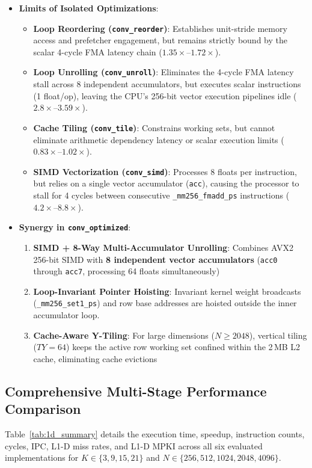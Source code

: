 \documentclass[11pt,a4paper]{article}
\begin{document}
\begin{itemize}
    \item \textbf{Limits of Isolated Optimizations}:
    \begin{itemize}
        \item \textbf{Loop Reordering (\texttt{conv\_reorder})}: Establishes unit-stride memory access and prefetcher engagement, but remains strictly bound by the scalar 4-cycle FMA latency chain ($1.35\times$--$1.72\times$).
        \item \textbf{Loop Unrolling (\texttt{conv\_unroll})}: Eliminates the 4-cycle FMA latency stall across 8 independent accumulators, but executes scalar instructions (1 float/op), leaving the CPU's 256-bit vector execution pipelines idle ($2.8\times$--$3.59\times$).
        \item \textbf{Cache Tiling (\texttt{conv\_tile})}: Constrains working sets, but cannot eliminate arithmetic dependency latency or scalar execution limits ($0.83\times$--$1.02\times$).
        \item \textbf{SIMD Vectorization (\texttt{conv\_simd})}: Processes 8 floats per instruction, but relies on a single vector accumulator (\texttt{acc}), causing the processor to stall for 4 cycles between consecutive \texttt{\_mm256\_fmadd\_ps} instructions ($4.2\times$--$8.8\times$).
    \end{itemize}
    \item \textbf{Synergy in \texttt{conv\_optimized}}:
    \begin{enumerate}
        \item \textbf{SIMD + 8-Way Multi-Accumulator Unrolling}: Combines AVX2 256-bit SIMD with \textbf{8 independent vector accumulators} (\texttt{acc0} through \texttt{acc7}, processing 64 floats simultaneously)
        \item \textbf{Loop-Invariant Pointer Hoisting}: Invariant kernel weight broadcasts (\texttt{\_mm256\_set1\_ps}) and row base addresses are hoisted outside the inner accumulator loop.
        \item \textbf{Cache-Aware Y-Tiling}: For large dimensions ($N \ge 2048$), vertical tiling ($TY=64$) keeps the active row working set confined within the 2\,MB L2 cache, eliminating cache evictions
    \end{enumerate}
\end{itemize}

\subsection{Comprehensive Multi-Stage Performance Comparison}
Table~\ref{tab:1d_summary} details the execution time, speedup,  instruction counts, cycles, IPC, L1-D miss rates, and L1-D MPKI across all six evaluated implementations for $K \in \{3, 9, 15, 21\}$ and $N \in \{256, 512, 1024, 2048, 4096\}$.
\end{document}
